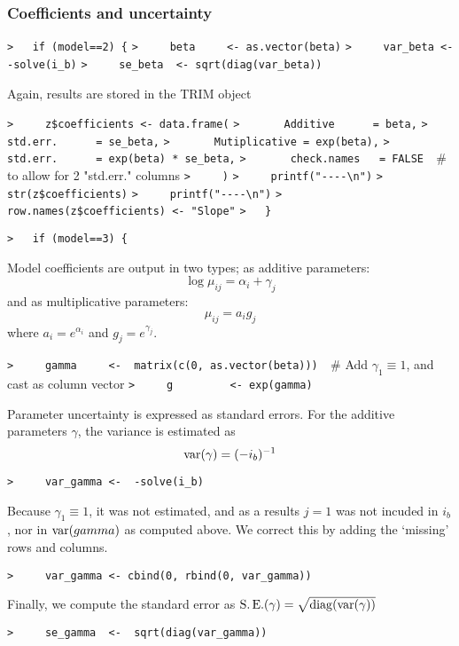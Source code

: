 \documentclass[a4paper]{article}
\begin{document}
\subsubsection{Coefficients and uncertainty}\par

\verb~>   if (model==2) {~\newline
\verb~>     beta     <- as.vector(beta)~\newline
\verb~>     var_beta <- -solve(i_b)~\newline
\verb~>     se_beta  <- sqrt(diag(var_beta))~\par

Again, results are stored in the TRIM object\par
\verb~>     z$coefficients <- data.frame(~\newline
\verb~>       Additive      = beta,~\newline
\verb~>       std.err.      = se_beta,~\newline
\verb~>       Mutiplicative = exp(beta),~\newline
\verb~>       std.err.      = exp(beta) * se_beta,~\newline
\verb~>       check.names   = FALSE  ~{\sffamily\# to allow for 2 "std.err." columns}\newline
\verb~>     )~\newline
\verb~>     printf("----\n")~\newline
\verb~>     str(z$coefficients)~\newline
\verb~>     printf("----\n")~\newline
\verb~>     row.names(z$coefficients) <- "Slope"~\newline
\verb~>   }~\par

\verb~>   if (model==3) {~\par
Model coefficients are output in two types; as additive parameters:
$$ \log\mu_{ij} = \alpha_i + \gamma_j $$
and as multiplicative parameters:
$$ \mu_{ij} = a_i g_j $$
where $a_i=e^{\alpha_i}$ and $g_j = e^{\gamma_j}$.\par
\verb~>     gamma     <-  matrix(c(0, as.vector(beta)))  ~{\sffamily\# Add $\gamma_1\equiv1$, and cast as column vector}\newline
\verb~>     g         <- exp(gamma)~\par

Parameter uncertainty is expressed as standard errors.
For the additive parameters $\gamma$, the variance is estimated as
$$ \operatorname{var}(\gamma) = (-i_b)^{-1} $$\par
\verb~>     var_gamma <-  -solve(i_b)~\par
Because $\gamma_1\equiv1$, it was not estimated, and as a results $j=1$ was not
incuded in $i_b$, nor in $\operatorname{var}(gamma)$ as computed above.
We correct this by adding the `missing' rows and columns.\par
\verb~>     var_gamma <- cbind(0, rbind(0, var_gamma))~\par
Finally, we compute the standard error as $\operatorname{S.E.}(\gamma) = \sqrt{\operatorname{diag}(\operatorname{var}(\gamma))}$\par
\verb~>     se_gamma  <-  sqrt(diag(var_gamma))~\par
\end{document}
